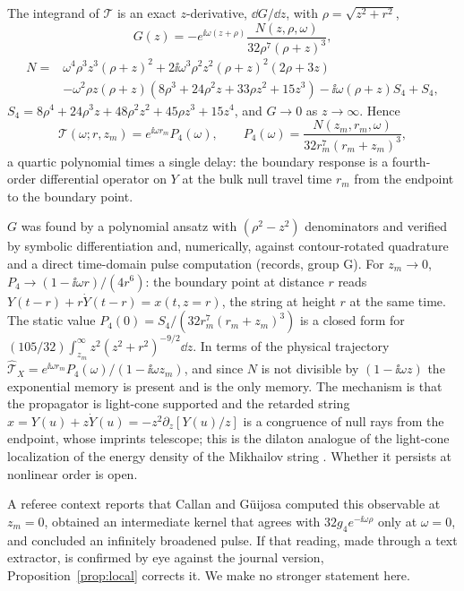 \begin{proposition}
\label{prop:local}
The integrand of $\mathcal T$ is an exact $z$-derivative, $\dd G/\dd z$, with $\rho=\sqrt{z^2+r^2}$,
\begin{equation}
G(z)=-e^{\ii\omega(z+\rho)}\frac{N(z,\rho,\omega)}{32\rho^7(\rho+z)^3},
\end{equation}
\begin{equation}
\begin{aligned}
N={}&\omega^4\rho^3z^3(\rho+z)^2+2\ii\omega^3\rho^2z^2(\rho+z)^2(2\rho+3z)\\
&-\omega^2\rho z(\rho+z)(8\rho^3+24\rho^2z+33\rho z^2+15z^3)-\ii\omega(\rho+z)S_4+S_4,
\end{aligned}
\end{equation}
$S_4=8\rho^4+24\rho^3z+48\rho^2z^2+45\rho z^3+15z^4$, and $G\to0$ as $z\to\infty$. Hence
\begin{equation}
\mathcal T(\omega;r,z_m)=e^{\ii\omega r_m}P_4(\omega),\qquad P_4(\omega)=\frac{N(z_m,r_m,\omega)}{32r_m^7(r_m+z_m)^3},
\label{eq:P4}
\end{equation}
a quartic polynomial times a single delay: the boundary response is a fourth-order differential operator on $Y$ at
the bulk null travel time $r_m$ from the endpoint to the boundary point.
\end{proposition}

$G$ was found by a polynomial ansatz with $(\rho^2-z^2)$ denominators and verified by symbolic differentiation and,
numerically, against contour-rotated quadrature and a direct time-domain pulse computation (records, group G). For
$z_m\to0$, $P_4\to(1-\ii\omega r)/(4r^6)$: the boundary point at distance $r$ reads
$Y(t-r)+r\dot Y(t-r)=x(t,z=r)$, the string at height $r$ at the same time. The static value
$P_4(0)=S_4/(32r_m^7(r_m+z_m)^3)$ is a closed form for $(105/32)\int_{z_m}^\infty z^2(z^2+r^2)^{-9/2}\dd z$. In terms of the
physical trajectory $\hat{\mathcal T}_X=e^{\ii\omega r_m}P_4(\omega)/(1-\ii\omega z_m)$, and since $N$ is not divisible by
$(1-\ii\omega z)$ the exponential memory is present and is the only memory. The mechanism is that the propagator is
light-cone supported and the retarded string $x=Y(u)+z\dot Y(u)=-z^2\partial_z[Y(u)/z]$ is a congruence of null rays
from the endpoint, whose imprints telescope; this is the dilaton analogue of the light-cone localization of the
energy density of the Mikhailov string \cite{ACLNR,HIMTradiation,Hubeny}. Whether it persists at nonlinear order is
open.

\begin{remark}
A referee context reports that Callan and Güijosa \cite{CallanGuijosa} computed this observable at $z_m=0$, obtained
an intermediate kernel that agrees with $32g_4e^{-\ii\omega\rho}$ only at $\omega=0$, and concluded an infinitely
broadened pulse. If that reading, made through a text extractor, is confirmed by eye against the journal version,
Proposition~\ref{prop:local} corrects it. We make no stronger statement here.
\end{remark}

